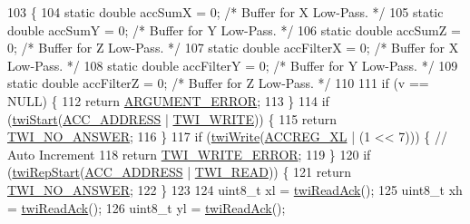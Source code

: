 \begin{DoxyCode}
103                            \{
104     \textcolor{keyword}{static} \textcolor{keywordtype}{double} accSumX = 0; \textcolor{comment}{/* Buffer for X Low-Pass. */}
105     \textcolor{keyword}{static} \textcolor{keywordtype}{double} accSumY = 0; \textcolor{comment}{/* Buffer for Y Low-Pass. */}
106     \textcolor{keyword}{static} \textcolor{keywordtype}{double} accSumZ = 0; \textcolor{comment}{/* Buffer for Z Low-Pass. */}
107     \textcolor{keyword}{static} \textcolor{keywordtype}{double} accFilterX = 0; \textcolor{comment}{/* Buffer for X Low-Pass. */}
108     \textcolor{keyword}{static} \textcolor{keywordtype}{double} accFilterY = 0; \textcolor{comment}{/* Buffer for Y Low-Pass. */}
109     \textcolor{keyword}{static} \textcolor{keywordtype}{double} accFilterZ = 0; \textcolor{comment}{/* Buffer for Z Low-Pass. */}
110 
111     \textcolor{keywordflow}{if} (v == NULL) \{
112         \textcolor{keywordflow}{return} \hyperlink{group__error_gga2c3e4bb40f36b262a5214e2da2bca9c5a49ccf277a69dd938c591928aa27c66cc}{ARGUMENT\_ERROR};
113     \}
114     \textcolor{keywordflow}{if} (\hyperlink{group__twi_ga4f86edc73f37ce976ea2225519ab31cd}{twiStart}(\hyperlink{group__config_ga27341a8e1cb1a6ace5a5cf3caea1c99f}{ACC\_ADDRESS} | \hyperlink{group__twi_ga3b68e8e777b71520f9dbfac733774d5f}{TWI\_WRITE})) \{
115         \textcolor{keywordflow}{return} \hyperlink{group__error_gga2c3e4bb40f36b262a5214e2da2bca9c5a04d5943ba652af2205c88b247e0c659c}{TWI\_NO\_ANSWER};
116     \}
117     \textcolor{keywordflow}{if} (\hyperlink{group__twi_gaf42e50aaf4a9794d3a2c000e7b407887}{twiWrite}(\hyperlink{group__acc_ga9d03f89f2f3ef006967f84157a21075b}{ACCREG\_XL} | (1 << 7))) \{ \textcolor{comment}{// Auto Increment}
118         \textcolor{keywordflow}{return} \hyperlink{group__error_gga2c3e4bb40f36b262a5214e2da2bca9c5ac0e3b3463dcaf220e54794b4711708c9}{TWI\_WRITE\_ERROR};
119     \}
120     \textcolor{keywordflow}{if} (\hyperlink{group__twi_ga996e3cbbbb7239e2278bd286e61f0791}{twiRepStart}(\hyperlink{group__config_ga27341a8e1cb1a6ace5a5cf3caea1c99f}{ACC\_ADDRESS} | \hyperlink{group__twi_gaaf9a8abccd811954f9cc316f2b2f87b3}{TWI\_READ})) \{
121         \textcolor{keywordflow}{return} \hyperlink{group__error_gga2c3e4bb40f36b262a5214e2da2bca9c5a04d5943ba652af2205c88b247e0c659c}{TWI\_NO\_ANSWER};
122     \}
123 
124     uint8\_t xl = \hyperlink{group__twi_ga0ab816bd0abcc24d6817f8395de7eafd}{twiReadAck}();
125     uint8\_t xh = \hyperlink{group__twi_ga0ab816bd0abcc24d6817f8395de7eafd}{twiReadAck}();
126     uint8\_t yl = \hyperlink{group__twi_ga0ab816bd0abcc24d6817f8395de7eafd}{twiReadAck}();

\end{DoxyCode}
